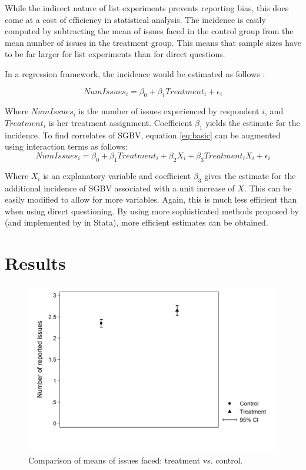 While the indirect nature of list experiments prevents reporting bias, this does come at a cost of efficiency in statistical analysis. The incidence is easily computed by subtracting the mean of issues faced in the control group from the mean number of issues in the treatment group. This means that sample sizes have to be far larger for list experiments than for direct questions. 

In a regression framework, the incidence would be estimated as follows \citep{Holbrook2010}:

\begin{equation}
\label{eq:basic}
NumIssues_i = \beta_0 + \beta_1 Treatment_i + \epsilon_i
\end{equation}

Where \(NumIssues_i\) is the number of issues experienced by respondent $i$, and \(Treatment_i\) is her treatment assignment. Coefficient \(\beta_1\) yields the estimate for the incidence. To find correlates of SGBV, equation \ref{eq:basic} can be augmented using interaction terms as follows: 
\begin{equation}
\label{eq:congogbv:interaction}
NumIssues_i = \beta_0 + \beta_1 Treatment_i + \beta_2 X_i + \beta_3 Treatment_i X_i + \epsilon_i
\end{equation}

Where \(X_i\) is an explanatory variable and coefficient \(\beta_3\) gives the estimate for the additional incidence of SGBV associated with a unit increase of \(X\). This can be easily modified to allow for more variables. Again, this is much less efficient than when using direct questioning. By using more sophisticated methods proposed by \citet{Imai2011} (and implemented by \cite{Tsai2019} in Stata), more efficient estimates can be obtained. 




\section{Results}

\begin{figure}[htb]
  \includegraphics[width=0.6\linewidth]{chapters/congogbv/figures/meancompare_overall.png}
  \caption{Comparison of means of issues faced: treatment vs. control.}
  \label{fig:meancompare_overall}
\end{figure}

